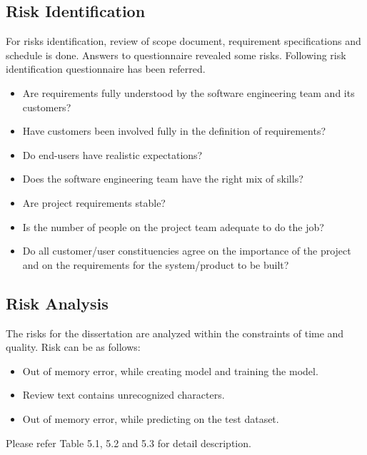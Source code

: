 \documentclass[oneside,a4paper,12pt]{pictreport}
\begin{document}
\subsection{Risk Identification}
For risks identification, review of scope document, requirement specifications and schedule is done. Answers to questionnaire revealed some risks. Following risk identification questionnaire has been referred.
\begin{itemize}
\item Are requirements fully understood by the software engineering team and its customers?
\item Have customers been involved fully in the definition of requirements?
\item Do end-users have realistic expectations?
\item Does the software engineering team have the right mix of skills?
\item Are project requirements stable?
\item Is the number of people on the project team adequate to do the job?
\item Do all customer/user constituencies agree on the importance of the project and on the requirements for the system/product to be built?
\end{itemize}

\subsection{Risk Analysis}
The risks for the dissertation are analyzed within the constraints of time and quality. Risk can be as follows:

\begin{itemize}
\item Out of memory error, while creating model and training the model.
\item Review text contains unrecognized characters.
\item Out of memory error, while predicting on the test dataset.
\end{itemize}
Please refer Table 5.1, 5.2 and 5.3 for detail description.
\end{document}

